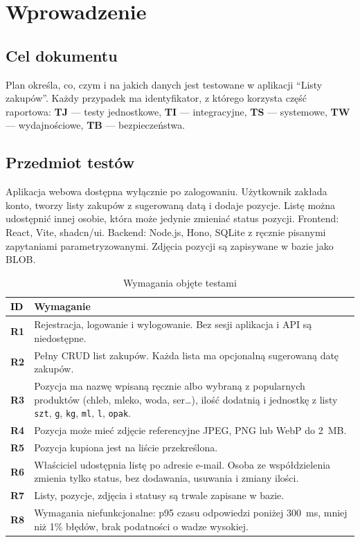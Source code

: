 \documentclass[a4paper,11pt]{article}
\newcommand{\code}[1]{\texttt{\small #1}}
\begin{document}
\section{Wprowadzenie}

\subsection{Cel dokumentu}
Plan określa, co, czym i na jakich danych jest testowane w aplikacji \enquote{Listy zakupów}.
Każdy przypadek ma identyfikator, z którego korzysta część raportowa:
\textbf{TJ} — testy jednostkowe, \textbf{TI} — integracyjne, \textbf{TS} — systemowe,
\textbf{TW} — wydajnościowe, \textbf{TB} — bezpieczeństwa.

\subsection{Przedmiot testów}
Aplikacja webowa dostępna wyłącznie po zalogowaniu. Użytkownik zakłada konto, tworzy listy
zakupów z sugerowaną datą i dodaje pozycje. Listę można udostępnić innej osobie, która może
jedynie zmieniać status pozycji. Frontend: React, Vite, shadcn/ui. Backend: Node.js, Hono,
SQLite z ręcznie pisanymi zapytaniami parametryzowanymi. Zdjęcia pozycji są zapisywane w bazie
jako BLOB.

\begin{table}[H]
\centering\small
\begin{tabularx}{\textwidth}{@{}>{\sffamily\bfseries\color{accent}}l L@{}}
\toprule
\textcolor{black}{ID} & \textsf{\textbf{Wymaganie}}\\
\midrule
R1 & Rejestracja, logowanie i wylogowanie. Bez sesji aplikacja i API są niedostępne.\\
R2 & Pełny CRUD list zakupów. Każda lista ma opcjonalną sugerowaną datę zakupów.\\
R3 & Pozycja ma nazwę wpisaną ręcznie albo wybraną z popularnych produktów (chleb, mleko, woda, ser…), ilość dodatnią i jednostkę z listy \code{szt}, \code{g}, \code{kg}, \code{ml}, \code{l}, \code{opak}.\\
R4 & Pozycja może mieć zdjęcie referencyjne JPEG, PNG lub WebP do 2~MB.\\
R5 & Pozycja kupiona jest na liście przekreślona.\\
R6 & Właściciel udostępnia listę po adresie e-mail. Osoba ze współdzielenia zmienia tylko status, bez dodawania, usuwania i zmiany ilości.\\
R7 & Listy, pozycje, zdjęcia i statusy są trwale zapisane w bazie.\\
R8 & Wymagania niefunkcjonalne: p95 czasu odpowiedzi poniżej 300~ms, mniej niż 1\% błędów, brak podatności o wadze wysokiej.\\
\bottomrule
\end{tabularx}
\caption{Wymagania objęte testami}
\label{tab:wymagania}
\end{table}
\end{document}
